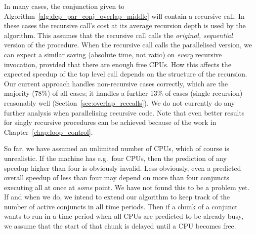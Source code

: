 In many cases,
the conjunction given to Algorithm~\ref{alg:dep_par_conj_overlap_middle}
will contain a recursive call.
In these cases the recursive call's cost at its average recursion depth is
used by the algorithm.
This assumes that the recursive call
calls the \emph{original, sequential} version of the procedure.
When the recursive call calls the parallelised version,
we can expect a similar saving (absolute time, not ratio)
on \emph{every} recursive invocation,
provided that there are enough free CPUs.
How this affects the expected speedup of the top level call
depends on the structure of the recursion.
Our current approach handles non-recursive cases correctly,
which are the majority (78\%) of all cases;
it handles a further 13\% of cases (single recursion) reasonably well
(Section~\ref{sec:overlap_reccalls}).
We do not currently do any further analysis when parallelising recursive
code.
Note that even better results for singly recursive procedures can be
achieved because of the work in Chapter~\ref{chap:loop_control}.

So far, we have assumed an unlimited number of CPUs,
which of course is unrealistic.
If the machine has e.g.\ four CPUs,
then the prediction of any speedup higher than four is obviously invalid.
Less obviously,
even a predicted overall speedup of less than four may depend
on more than four conjuncts executing all at once at \emph{some} point.
We have not found this to be a problem yet.
If and when we do,
we intend to extend our algorithm to keep track
of the number of active conjuncts in all time periods.
Then if a chunk of a conjunct wants to run in a time period
when all CPUs are predicted to be already busy,
we assume that the start of that chunk is delayed until a CPU becomes free.

